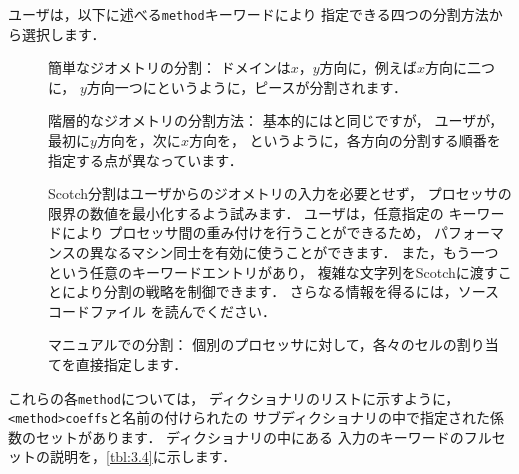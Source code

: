 ユーザは，以下に述べる\verb|method|キーワードにより
指定できる四つの分割方法から選択します．
\begin{description}
 \item[]
%
%
            簡単なジオメトリの分割：
            ドメインは$x$，$y$方向に，例えば$x$方向に二つに，
            $y$方向一つにというように，ピースが分割されます．
 \item[]
%
%
            階層的なジオメトリの分割方法：
            基本的にはと同じですが，
            ユーザが，最初に$y$方向を，次に$x$方向を，
            というように，各方向の分割する順番を指定する点が異なっています．
 \item[]
%
%
            Scotch分割はユーザからのジオメトリの入力を必要とせず，
            プロセッサの限界の数値を最小化するよう試みます．
            ユーザは，任意指定の
%
%
            キーワードにより
            プロセッサ間の重み付けを行うことができるため，
            パフォーマンスの異なるマシン同士を有効に使うことができます．
            また，もう一つ
%
%
            という任意のキーワードエントリがあり，
            複雑な文字列をScotchに渡すことにより分割の戦略を制御できます．
            さらなる情報を得るには，ソースコードファイル
            を読んでください．
 \item[]
%
%
            マニュアルでの分割：
            個別のプロセッサに対して，各々のセルの割り当てを直接指定します．
\end{description}
これらの各\verb|method|については，
ディクショナリのリストに示すように，
\verb|<method>coeffs|と名前の付けられたの
サブディクショナリの中で指定された係数のセットがあります．
ディクショナリの中にある
入力のキーワードのフルセットの説明を，\autoref{tbl:3.4}に示します．


